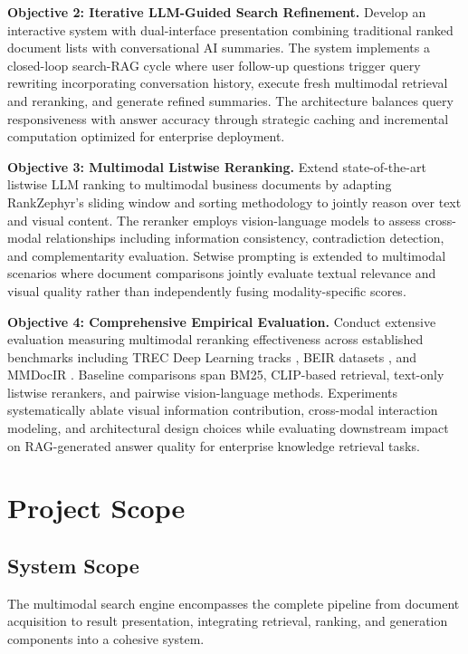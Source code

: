 \noindent\textbf{Objective 2: Iterative LLM-Guided Search Refinement.} Develop an interactive system with dual-interface presentation combining traditional ranked document lists with conversational AI summaries. The system implements a closed-loop search-RAG cycle where user follow-up questions trigger query rewriting incorporating conversation history, execute fresh multimodal retrieval and reranking, and generate refined summaries. The architecture balances query responsiveness with answer accuracy through strategic caching and incremental computation optimized for enterprise deployment.

\noindent\textbf{Objective 3: Multimodal Listwise Reranking.} Extend state-of-the-art listwise LLM ranking to multimodal business documents by adapting RankZephyr's sliding window and sorting methodology to jointly reason over text and visual content. The reranker employs vision-language models to assess cross-modal relationships including information consistency, contradiction detection, and complementarity evaluation. Setwise prompting is extended to multimodal scenarios where document comparisons jointly evaluate textual relevance and visual quality rather than independently fusing modality-specific scores.

\noindent\textbf{Objective 4: Comprehensive Empirical Evaluation.} Conduct extensive evaluation measuring multimodal reranking effectiveness across established benchmarks including TREC Deep Learning tracks \cite{craswell2020overview, craswell2021overview}, BEIR datasets \cite{thakur2021beir}, and MMDocIR \cite{dong2025mmdocir}. Baseline comparisons span BM25, CLIP-based retrieval, text-only listwise rerankers, and pairwise vision-language methods. Experiments systematically ablate visual information contribution, cross-modal interaction modeling, and architectural design choices while evaluating downstream impact on RAG-generated answer quality for enterprise knowledge retrieval tasks.

\section{Project Scope}

\subsection{System Scope}

The multimodal search engine encompasses the complete pipeline from document acquisition to result presentation, integrating retrieval, ranking, and generation components into a cohesive system.

